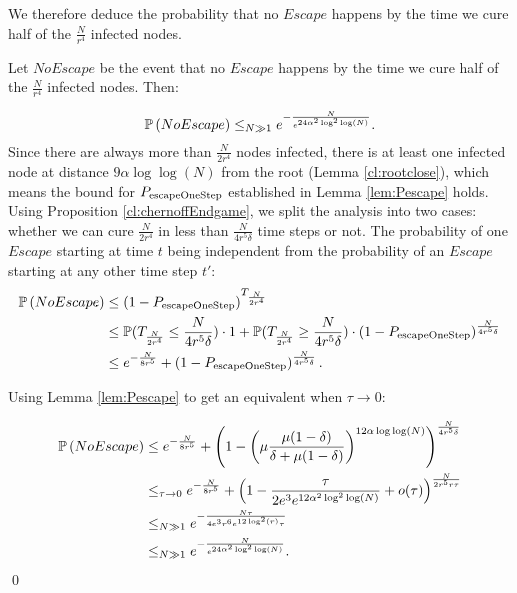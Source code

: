 We therefore deduce the probability that no $Escape$ happens by the time we cure half of the $\frac{N}{r^4}$ infected nodes.

\begin{lemma} \label{lem:pNoescape}
Let $NoEscape$ be the event that no $Escape$ happens by the time we cure half of the $\frac{N}{r^4}$ infected nodes. Then:

\[\mathbb{P} \left(NoEscape \right) \leq_{N \gg 1} e^{-\frac{N}{e^{24\alpha^2\log^2\log(N)}}}. \]
\proof Since there are always more than $\frac{N}{2r^4}$ nodes infected, there is at least one infected node at distance $9\alpha\log\log(N)$ from the root (Lemma \ref{cl:rootclose}), which means the bound for $P_{\rm escapeOneStep}$ established in Lemma \ref{lem:Pescape} holds. Using Proposition \ref{cl:chernoffEndgame}, we split the analysis into two cases: whether we can cure  $\frac{N}{2r^4}$ in less than $\frac{N}{4r^5\delta}$ time steps or not. The probability of one $Escape$ starting at time $t$ being independent from the probability of an $Escape$ starting at any other time step $t'$:
\begin{align*}
\mathbb{P} \left(NoEscape \right) &\leq  \left(1- P_{\rm escapeOneStep} \right)^{T_{\frac{N}{2r^4}}} \\
&\leq  \mathbb{P}(T_{\frac{N}{2r^4}} \leq \frac{N}{4r^5\delta})\cdot  1 + \mathbb{P}(T_{\frac{N}{2r^4}} \geq \frac{N}{4r^5\delta})\cdot \left(1- P_{\rm escapeOneStep} \right)^{\frac{N}{4r^5\delta}} \\
&\leq  e^{-\frac{N}{8r^5}} + \left(1- P_{\rm escapeOneStep} \right)^{\frac{N}{4r^5\delta}}.
\end{align*}

Using Lemma \ref{lem:Pescape} to get an equivalent when $\tau \to 0$:

\begin{align*}
\mathbb{P} \left(NoEscape \right) &\leq e^{-\frac{N}{8r^5}} +  \left(1- \left(\mu\frac{\mu (1-\delta)}{\delta + \mu (1-\delta)} \right)^{12\alpha\log\log(N)} \right)^{\frac{N}{4 r^5\delta}} \\
&\leq_{\tau \to 0} e^{-\frac{N}{8r^5}} + \left(1 - \frac{\tau}{2e^3e^{12\alpha^2\log^2\log(N)}} + o(\tau) \right)^{\frac{N}{2r^5r\tau}}  \\ 
&\leq_{N \gg 1} e^{-\frac{N\tau}{4e^3r^6e^{12\log^2(r)}\tau}} \\
&\leq_{N \gg 1} e^{-\frac{N}{e^{24\alpha^2\log^2\log(N)}}}.
\end{align*}
\qed
\end{lemma}




